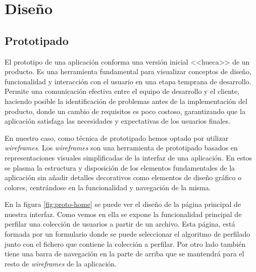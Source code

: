\chapter{Diseño}
\section{Prototipado}
El prototipo de una aplicación conforma una versión inicial <<hueca>> de un producto. Es una herramienta fundamental para visualizar conceptos de diseño, funcionalidad y interacción con el usuario en una etapa temprana de desarrollo. Permite una comunicación efectiva entre el equipo de desarrollo y el cliente, haciendo posible la identificación de problemas antes de la implementación del producto, donde un cambio de requisitos es poco costoso, garantizando que la aplicación satisfaga las necesidades y expectativas de los usuarios finales.

En nuestro caso, como técnica de prototipado hemos optado por utilizar \textit{wireframes}. Los \textit{wireframes} son una herramienta de prototipado basados en representaciones visuales simplificadas de la interfaz de una aplicación. En estos se plasma la estructura y disposición de los elementos fundamentales de la aplicación sin añadir detalles decorativos como elementos de diseño gráfico o colores, centrándose en la funcionalidad y navegación de la misma.

En la figura \ref{fig:proto-home} se puede ver el diseño de la página principal de nuestra interfaz. Como vemos en ella se expone la funcionalidad principal de perfilar una colección de usuarios a partir de un archivo. Esta página, está formada por un formulario donde se puede seleccionar el algoritmo de perfilado junto con el fichero que contiene la colección a perfilar. Por otro lado también tiene una barra de navegación en la parte de arriba que se mantendrá para el resto de \textit{wireframes} de la aplicación.


